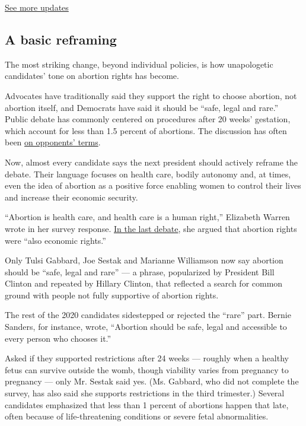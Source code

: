 \href{https://www.nytimes3xbfgragh.onion/live/2020/08/19/us/dnc-convention-election?action=click\&pgtype=Article\&state=default\&region=MAIN_CONTENT_1\&context=storylines_live_updates}{See
more updates}

\hypertarget{a-basic-reframing}{%
\subsection{A basic reframing}\label{a-basic-reframing}}

The most striking change, beyond individual policies, is how
unapologetic candidates' tone on abortion rights has become.

Advocates have traditionally said they support the right to choose
abortion, not abortion itself, and Democrats have said it should be
``safe, legal and rare.'' Public debate has commonly centered on
procedures after 20 weeks' gestation, which account for less than 1.5
percent of abortions. The discussion has often been
\href{https://www.nytimes3xbfgragh.onion/2019/05/16/us/politics/abortion-republicans-democrats.html}{on
opponents' terms}.

Now, almost every candidate says the next president should actively
reframe the debate. Their language focuses on health care, bodily
autonomy and, at times, even the idea of abortion as a positive force
enabling women to control their lives and increase their economic
security.

``Abortion is health care, and health care is a human right,'' Elizabeth
Warren wrote in her survey response.
\href{https://www.nytimes3xbfgragh.onion/2019/11/21/us/politics/abortion-rights-debate.html?}{In
the last debate}, she argued that abortion rights were ``also economic
rights.''

Only Tulsi Gabbard, Joe Sestak and Marianne Williamson now say abortion
should be ``safe, legal and rare'' --- a phrase, popularized by
President Bill Clinton and repeated by Hillary Clinton, that reflected a
search for common ground with people not fully supportive of abortion
rights.

The rest of the 2020 candidates sidestepped or rejected the ``rare''
part. Bernie Sanders, for instance, wrote, ``Abortion should be safe,
legal and accessible to every person who chooses it.''

Asked if they supported restrictions after 24 weeks --- roughly when a
healthy fetus can survive outside the womb, though viability varies from
pregnancy to pregnancy --- only Mr. Sestak said yes. (Ms. Gabbard, who
did not complete the survey, has also said she supports restrictions in
the third trimester.) Several candidates emphasized that less than 1
percent of abortions happen that late, often because of life-threatening
conditions or severe fetal abnormalities.


